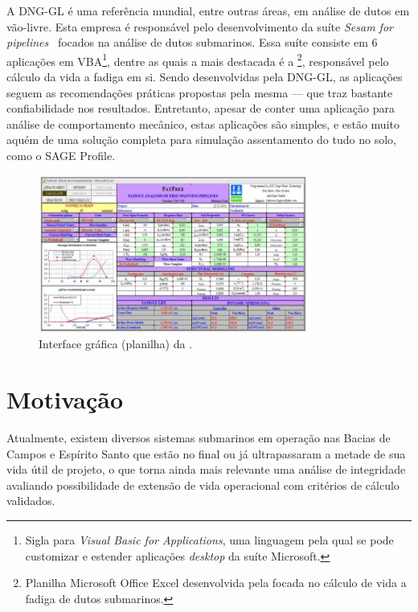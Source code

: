 A DNG-GL é uma referência mundial, entre outras áreas, em análise de dutos em vão-livre. Esta empresa é responsável pelo desenvolvimento da suíte \textit{Sesam for pipelines}~\cite{dnvsesam} focados na análise de dutos submarinos.
Essa suíte consiste em 6 aplicações em VBA\footnote{Sigla para \textit{Visual Basic for Applications}, uma linguagem pela qual se pode customizar e estender aplicações \textit{desktop} da suíte Microsoft.}, dentre as quais a mais destacada é a \fatfree\footnote{Planilha Microsoft Office Excel desenvolvida pela  focada no cálculo de vida a fadiga de dutos submarinos.}, responsável pelo cálculo da vida a fadiga em si. Sendo desenvolvidas pela DNG-GL, as aplicações seguem as recomendações práticas propostas pela mesma --- que traz bastante confiabilidade nos resultados. Entretanto, apesar de conter uma aplicação para análise de comportamento mecânico, estas aplicações são simples, e estão muito aquém de uma solução completa para simulação assentamento do tudo no solo, como o SAGE Profile.

\begin{figure}[!ht]
    \centering
    \caption{Interface gráfica (planilha) da \fatfree.}\label{fig:fatfree}
    \includegraphics[width=0.8\textwidth]{imagens/fatfree}
\end{figure}


\section{Motivação}


Atualmente, existem diversos sistemas submarinos em operação nas Bacias de Campos e Espírito Santo que estão no final ou já ultrapassaram a metade de sua vida útil de projeto, o que torna ainda mais relevante uma análise de integridade avaliando possibilidade de extensão de vida operacional com critérios de cálculo validados.


